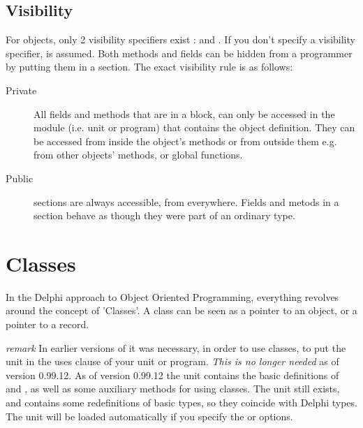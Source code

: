 \documentclass{report}
\begin{document}
\section{Visibility}
For objects, only 2 visibility specifiers exist :  and
. If you don't specify a visibility specifier, 
is assumed.
Both methods and fields can be hidden from a programmer by putting them
in a  section. The exact visibility rule is as follows:
\begin{description}
\item [Private\ ] All fields and methods that are in a  block,
can  only be accessed in the module (i.e. unit or program) that contains
the object definition.
They can be accessed from inside the object's methods or from outside them
e.g. from other objects' methods, or global functions.
\item [Public\ ] sections are always accessible, from everywhere.
Fields and metods in a  section behave as though they were part
of an ordinary  type.
\end{description}



\chapter{Classes}
\label{ch:Classes}
In the Delphi approach to Object Oriented Programming, everything revolves
around  the concept of 'Classes'.  A class can be seen as a pointer to an
object, or a pointer to a record.

{\em remark}  In earlier versions of \fpc it was necessary, in order to 
use classes, to put the  unit in the uses 
clause of your unit or program. {\em This is no longer needed} as of version
0.99.12. As of version 0.99.12 the  unit contains the basic 
definitions of  and  , as well as some 
auxiliary methods for using classes.
The  unit still exists, and contains some redefinitions of
basic types, so they coincide with Delphi types. The unit will be loaded
automatically if you specify the  or  options.


\end{document}
